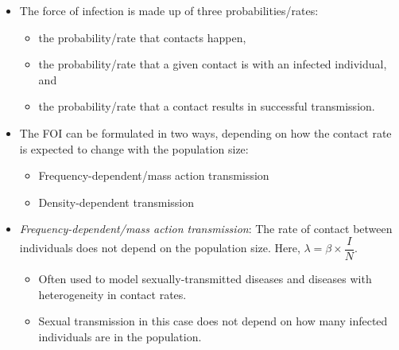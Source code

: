 \documentclass[
  ignorenonframetext,
]{beamer}
\providecommand{\tightlist}{%
  \setlength{\itemsep}{0pt}\setlength{\parskip}{0pt}}\usepackage{longtable,booktabs,array}
\begin{document}
\begin{frame}
\begin{itemize}
\tightlist
\item
  The force of infection is made up of three probabilities/rates:

  \begin{itemize}
  \tightlist
  \item
    the probability/rate that contacts happen,
  \item
    the probability/rate that a given contact is with an infected
    individual, and
  \item
    the probability/rate that a contact results in successful
    transmission.
  \end{itemize}
\end{itemize}
\end{frame}

\begin{frame}
\begin{itemize}
\tightlist
\item
  The FOI can be formulated in two ways, depending on how the contact
  rate is expected to change with the population size:

  \begin{itemize}
  \tightlist
  \item
    Frequency-dependent/mass action transmission
  \item
    Density-dependent transmission
  \end{itemize}
\end{itemize}
\end{frame}

\begin{frame}
\begin{itemize}
\tightlist
\item
  {\emph{Frequency-dependent/mass action transmission}}: The rate of
  contact between individuals does not depend on the population size.
  Here, {\(\lambda = \beta \times \dfrac{I}{N}\)}.

  \begin{itemize}
  \tightlist
  \item
    Often used to model sexually-transmitted diseases and diseases with
    heterogeneity in contact rates.
  \item
    Sexual transmission in this case does not depend on how many
    infected individuals are in the population.
  \end{itemize}
\end{itemize}

\end{frame}
\end{document}
